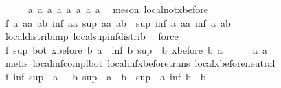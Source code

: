 \begin{isabellebody}
\ \ \ \ \isamarkupfalse%
\ a{}\ a{}\ a{}\ a{}\ a{}\ a{}\ a{}\ a{}\ \isamarkupfalse%
\ {\isacharparenleft}meson\ local{\isachardot}not{\isacharunderscore}xbefore{\isacharparenright}\isanewline
\ \ \isamarkupfalse%
\ f{}{}{\isacharcolon}\ {\isachardoublequoteopen}{\isasymforall}a\ aa\ ab{\isachardot}\ inf\ {\isacharparenleft}a{\isacharcolon}{\isacharcolon}{\isacharprime}a{\isacharparenright}\ {\isacharparenleft}sup\ aa\ ab{\isacharparenright}\ {\isacharequal}\ sup\ {\isacharparenleft}inf\ a\ aa{\isacharparenright}\ {\isacharparenleft}inf\ a\ ab{\isacharparenright}{\isachardoublequoteclose}\isanewline
\ \ \ \ \isamarkupfalse%
\ local{\isachardot}distrib{\isacharunderscore}imp{}\ local{\isachardot}sup{\isacharunderscore}inf{\isacharunderscore}distrib{}\ \isamarkupfalse%
\ force\isanewline
\ \ \isamarkupfalse%
\ \isamarkupfalse%
\ f{}{}{\isacharcolon}\ {\isachardoublequoteopen}sup\ bot\ {\isacharparenleft}xbefore\ b\ a{\isacharparenright}\ {\isacharequal}\ inf\ b\ {\isacharparenleft}sup\ {\isacharparenleft}{\isacharminus}\ b{\isacharparenright}\ {\isacharparenleft}xbefore\ b\ a{\isacharparenright}{\isacharparenright}{\isachardoublequoteclose}\isanewline
\ \ \ \ \isamarkupfalse%
\ a{}\ a{}\ \isamarkupfalse%
\ {\isacharparenleft}metis\ local{\isachardot}inf{\isacharunderscore}compl{\isacharunderscore}bot\ local{\isachardot}inf{\isacharunderscore}xbefore{\isacharunderscore}trans\ local{\isachardot}xbefore{\isacharunderscore}neutral{\isacharunderscore}{}{\isacharparenright}\isanewline
\ \ \isamarkupfalse%
\ f{}{}{\isacharcolon}\ {\isachardoublequoteopen}inf\ {\isacharparenleft}sup\ {\isacharparenleft}{\isacharminus}\ a{\isacharparenright}\ {\isacharparenleft}{\isacharminus}\ {\isacharparenleft}{\isacharminus}\ b{\isacharparenright}{\isacharparenright}{\isacharparenright}\ {\isacharparenleft}sup\ {\isacharparenleft}{\isacharminus}\ a{\isacharparenright}\ {\isacharparenleft}{\isacharminus}\ b{\isacharparenright}{\isacharparenright}\ {\isacharequal}\ sup\ {\isacharparenleft}{\isacharminus}\ a{\isacharparenright}\ {\isacharparenleft}inf\ b\ {\isacharparenleft}{\isacharminus}\ b{\isacharparenright}{\isacharparenright}{\isachardoublequoteclose}\isanewline
\ \ \ \ \isamarkupfalse%

\end{isabellebody}
